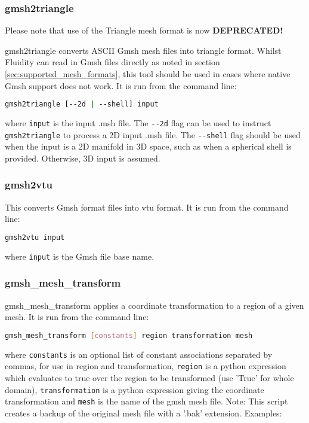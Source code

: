 
\subsubsection{gmsh2triangle}
\label{sec:gmsh2triangle}
Please note that use of the Triangle mesh format is now {\bf DEPRECATED!}

gmsh2triangle converts ASCII Gmsh mesh files into triangle format. Whilst Fluidity
can read in Gmsh files directly as noted in section \ref{sec:supported_mesh_formats},
this tool should be used in cases where native Gmsh support does not work.
It is run from the command line:
\begin{lstlisting}[language = Bash]
gmsh2triangle [--2d | --shell] input
\end{lstlisting}
where \lstinline[language = Bash]+input+ is the input .msh file.
The \lstinline[language = Bash]+--2d+ flag can be used to instruct \lstinline+gmsh2triangle+
to process a 2D input .msh file.
The \lstinline[language = Bash]+--shell+ flag should be used when the input is a 2D
manifold in 3D space, such as when a spherical shell is provided. Otherwise, 3D input is assumed.


\subsubsection{gmsh2vtu}
\label{sec:gmsh2vtu}
This converts Gmsh format files into vtu format. It is run from the command line:

\begin{lstlisting}[language = Bash]
gmsh2vtu input
\end{lstlisting}

where \lstinline+input+ is the Gmsh file base name.


\subsubsection{gmsh\_mesh\_transform}
\label{sec:gmsh_mesh_transform}

gmsh\_mesh\_transform applies a coordinate transformation to a region of a given mesh. It is run from the command line:
\begin{lstlisting}[language = Bash]
gmsh_mesh_transform [constants] region transformation mesh
\end{lstlisting}
where \lstinline[language = Bash]+constants+ is an optional list of constant associations separated by commas, for use in region and transformation, \lstinline[language = Bash]+region+ is a python expression which evaluates to true over the region to be transformed (use 'True' for whole domain), \lstinline[language = Bash]+transformation+ is a python expression giving the coordinate transformation and \lstinline[language = Bash]+mesh+ is the name of the gmsh mesh file.
Note: This script creates a backup of the original mesh file with a '.bak' extension.
Examples:

